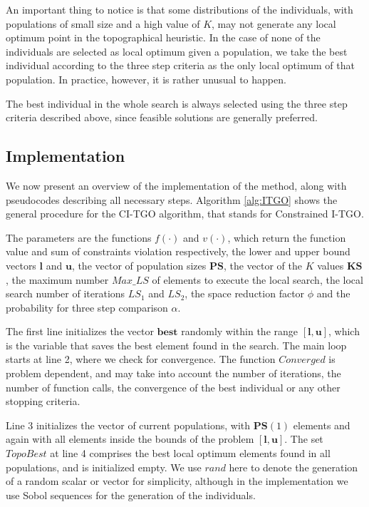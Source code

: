 An important thing to notice is that some distributions of the individuals, with populations of small size and a high value of $K$, may not generate any local optimum point in the topographical heuristic. In the case of none of the individuals are selected as local optimum given a population, we take the best individual according to the three step criteria as the only local optimum of that population. In practice, however, it is rather unusual to happen.

The best individual in the whole search is always selected using the three step criteria described above, since  feasible solutions are generally preferred.


\subsection{Implementation}

We now present an overview of the implementation of the method, along with pseudocodes describing all necessary steps. Algorithm \ref{alg:ITGO} shows the general procedure for the CI-TGO algorithm, that stands for Constrained I-TGO. 

The parameters are the functions $f(\cdot)$ and $v(\cdot)$, which return the function value and sum of constraints violation respectively, the lower and upper bound vectors $\bm{l}$ and $\bm{u}$, the vector of population sizes $\bm{PS}$, the vector of the $K$ values $\bm{KS}$, the maximum number $Max\_LS$ of elements to execute the local search, the local search number of iterations $LS_1$ and $LS_2$, the space reduction factor $\phi$ and the probability for three step comparison $\alpha$.






The first line initializes the vector $\bm{best}$ randomly within the range $[\bm{l}, \bm{u}]$, which is the variable that saves the best element found in the search. The main loop starts at line 2, where we check for convergence. The function $Converged$ is problem dependent, and may take into account the number of iterations, the number of function calls, the convergence of the best individual or any other stopping criteria.

Line 3 initializes the vector of current populations, with $\bm{PS}(1)$ elements and again with all elements inside the bounds of the problem $[\bm{l}, \bm{u}]$. The set $TopoBest$ at line 4 comprises the best local optimum elements found in all populations, and is initialized empty. We use $rand$ here to denote the generation of a random scalar or vector for simplicity, although in the implementation we use Sobol sequences for the generation of the individuals.

